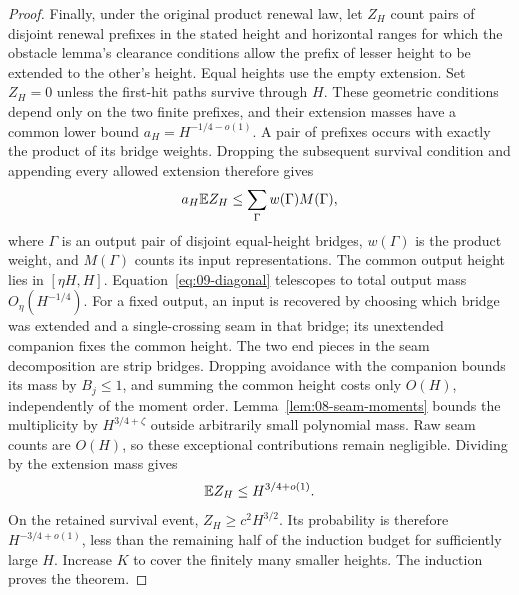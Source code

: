 \begin{proof}
Finally, under the original product renewal law, let \(Z_H\) count pairs
of disjoint renewal prefixes in the stated height and horizontal ranges
for which the obstacle lemma's clearance conditions allow the prefix of
lesser height to be extended to the other's height. Equal heights use the
empty extension. Set \(Z_H=0\) unless the first-hit
paths survive through \(H\). These geometric conditions depend only on
the two finite prefixes, and their extension masses have a common lower
bound \(a_H=H^{-1/4-o(1)}\). A pair of prefixes occurs with exactly the
product of its bridge weights. Dropping the subsequent survival condition
and appending every allowed extension therefore gives
\[
 a_H\mathbb E Z_H\le\sum_{\Gamma}w(\Gamma)M(\Gamma),
\]
where \(\Gamma\) is an output pair of disjoint equal-height bridges,
\(w(\Gamma)\) is the product weight, and \(M(\Gamma)\) counts its
input representations. The common output height lies in
\([\eta H,H]\). Equation~\eqref{eq:09-diagonal} telescopes
to total output mass \(O_\eta(H^{-1/4})\).  For a fixed output, an
input is recovered by choosing which bridge was extended and a
single-crossing seam in that bridge; its unextended companion fixes
the common height. The two end pieces in the seam decomposition are
strip bridges. Dropping avoidance with the companion bounds its mass by
\(B_j\le1\), and summing the common height costs only \(O(H)\),
independently of the moment order. Lemma~\ref{lem:08-seam-moments} bounds the
multiplicity by \(H^{3/4+\zeta}\) outside arbitrarily small
polynomial mass.  Raw seam counts are \(O(H)\), so these exceptional
contributions remain negligible.  Dividing by the extension mass gives
\[
                          \mathbb E Z_H\le H^{3/4+o(1)}.
\]
On the retained survival event, \(Z_H\ge c^2H^{3/2}\).
Its probability is therefore \(H^{-3/4+o(1)}\), less than the
remaining half of the induction budget for sufficiently large \(H\).
Increase \(K\) to cover the finitely many smaller heights.  The
induction proves the theorem.
\end{proof}
